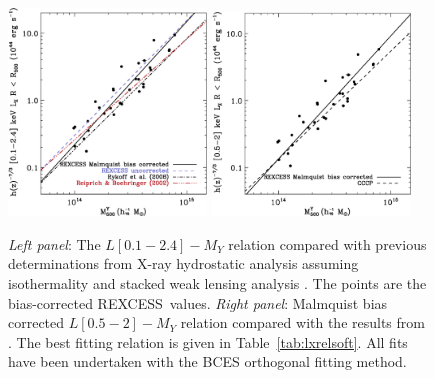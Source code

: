 \documentclass[oldversion]{aa}
\newcommand{\rexcess}{{\gwpfont REXCESS}}
\begin{document}
\begin{figure}[]
\includegraphics[width=0.47\textwidth]{0944fb2a.eps}
\hfill
\includegraphics[width=0.47\textwidth]{0944fb2b.eps}
\caption{{\footnotesize  {\it Left panel}: The $L[0.1-2.4] - M_Y$ relation compared with previous determinations from X-ray hydrostatic analysis assuming isothermality \citep{rb02} and stacked weak lensing analysis \citep{rykoff08}. The points are the bias-corrected \rexcess\ values. {\it Right panel}: Malmquist bias corrected $L[0.5-2] - M_Y$ relation compared with  the results from \citet{vikh08}. The best fitting relation is given in Table~\ref{tab:lxrelsoft}. All fits have been undertaken with the BCES orthogonal fitting method.}}\label{fig:052LxMmcorr} 
   \end{figure}
\end{document}
